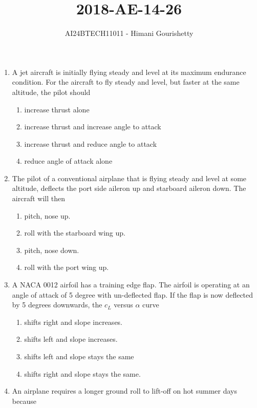 \documentclass[journal,12pt,onecolumn]{IEEEtran}
\theoremstyle{remark}
\begin{document}

\vspace{3cm}

\title{2018-AE-14-26}
\author{AI24BTECH11011 - Himani Gourishetty}
\maketitle
\bigskip

\renewcommand{\thefigure}{\theenumi}
\renewcommand{\thetable}{\theenumi}
\begin{enumerate}
\item A jet aircraft is initially flying steady and level at its maximum endurance condition. For the aircraft to fly steady and level, but faster at the same altitude, the pilot should
\begin{enumerate}
    \item increase thrust alone
    \item increase thrust and increase angle to attack
    \item increase thrust and reduce angle to attack
    \item reduce angle of attack alone
\end{enumerate}
\item The pilot of a conventional airplane that is flying steady and level at some altitude, deflects the port side aileron up and starboard aileron down. The aircraft will then
\begin{enumerate}
    \item pitch, nose up.
    \item roll with the starboard wing up.
    \item pitch, nose down.
    \item roll with the port wing up.
\end{enumerate}
\item A NACA 0012 airfoil has a training edge flap. The airfoil is operating at an angle of attack of 5 degree with un-deflected flap. If the flap is now deflected by 5 degrees downwards, the $c_L$ versus $\alpha$ curve
\begin{enumerate}
    \item shifts right and slope increases.
    \item shifts left and slope increases.
    \item shifts left and slope stays the same
    \item shifts right and slope stays the same.
\end{enumerate}
\item An airplane requires a longer ground roll to lift-off on hot summer days because

\end{enumerate}
\end{document}
